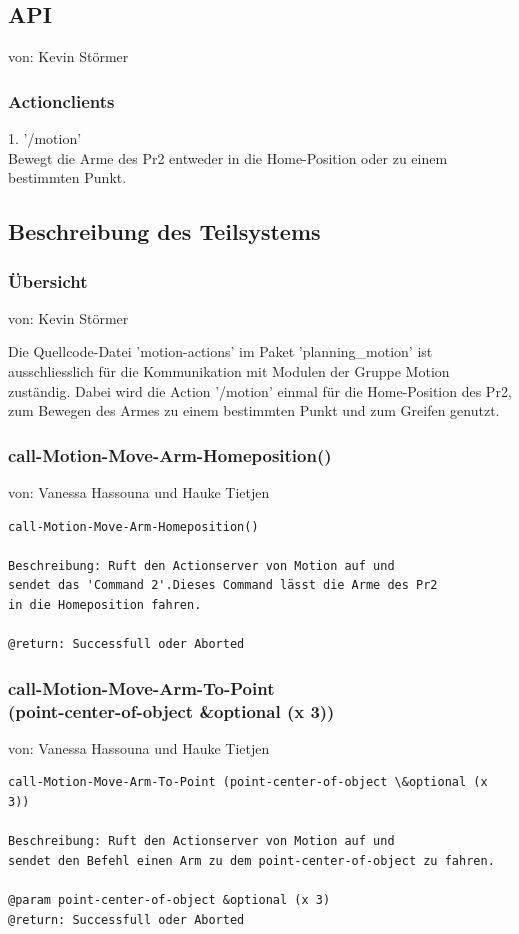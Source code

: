 \documentclass{suturo}
\makeatletter
\newcommand{\chapterauthor}[1]{%
  {\parindent0pt\vspace*{-27pt}%
  \linespread{0}\small\begin{flushright}von: #1\end{flushright}%
  \par\nobreak\vspace*{0pt}}
  \@afterheading%
}
\makeatother
\begin{document}
\subsection{API}
\chapterauthor{Kevin Störmer}
\subsubsection{Actionclients}
1. '/motion' \\
Bewegt die Arme des Pr2 entweder in die Home-Position oder zu einem bestimmten Punkt.
\subsection{Beschreibung des Teilsystems}
\subsubsection{\"Ubersicht}
\chapterauthor{Kevin Störmer}
Die Quellcode-Datei 'motion-actions' im Paket 'planning\_motion'  ist ausschliesslich für die Kommunikation mit Modulen der Gruppe Motion zuständig. Dabei wird die Action '/motion' einmal für die Home-Position des Pr2, zum Bewegen des Armes zu einem bestimmten Punkt und zum Greifen genutzt.


\subsubsection{call-Motion-Move-Arm-Homeposition()}
\chapterauthor{Vanessa Hassouna und Hauke Tietjen}
\begin{verbatim}
call-Motion-Move-Arm-Homeposition()

Beschreibung: Ruft den Actionserver von Motion auf und
sendet das 'Command 2'.Dieses Command lässt die Arme des Pr2 
in die Homeposition fahren.

@return: Successfull oder Aborted
\end{verbatim}



\subsubsection{call-Motion-Move-Arm-To-Point \\
(point-center-of-object \&optional (x 3))
}
\chapterauthor{Vanessa Hassouna und Hauke Tietjen}
\begin{verbatim}
call-Motion-Move-Arm-To-Point (point-center-of-object \&optional (x 3))

Beschreibung: Ruft den Actionserver von Motion auf und 
sendet den Befehl einen Arm zu dem point-center-of-object zu fahren.

@param point-center-of-object &optional (x 3)
@return: Successfull oder Aborted
\end{verbatim}
\end{document}
